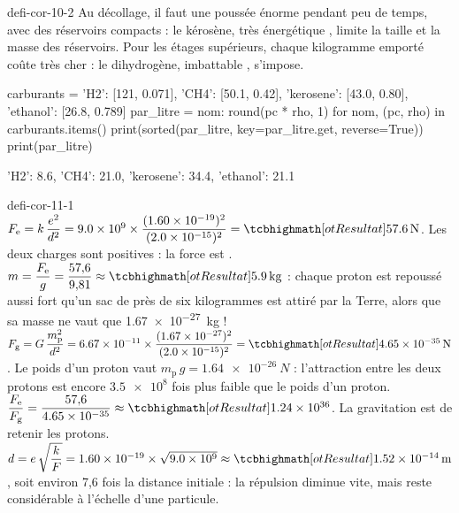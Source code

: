 \begin{blocEdition}{defi-cor-10-2}
\label{figedition-defi-cor-10-2-1}
Au décollage, il faut une poussée énorme pendant peu de temps, avec des réservoirs compacts : le kérosène, très
énergétique , limite la taille et la masse des réservoirs. Pour les étages supérieurs, chaque kilogramme
emporté coûte très cher : le dihydrogène, imbattable , s'impose.
\begin{python}
carburants = {'H2': [121, 0.071], 'CH4': [50.1, 0.42],
              'kerosene': [43.0, 0.80], 'ethanol': [26.8, 0.789]}
par_litre = {nom: round(pc * rho, 1) for nom, (pc, rho) in carburants.items()}
print(sorted(par_litre, key=par_litre.get, reverse=True))
print(par_litre)
\end{python}
\begin{console}
{'H2': 8.6, 'CH4': 21.0, 'kerosene': 34.4, 'ethanol': 21.1}
\end{console}
\end{blocEdition}

\begin{blocEdition}{defi-cor-11-1}
$F_\mathrm{e}=k\,\dfrac{e^2}{d^2}=\num{9,0e9}\times\dfrac{(\num{1,60e-19})^2}{(\num{2,0e-15})^2}=\res{\qty{57,6}{N}}$. Les deux charges sont positives : la force est .
$m=\dfrac{F_\mathrm{e}}{g}=\dfrac{57{,}6}{9{,}81}\approx\res{\qty{5,9}{kg}}$ : chaque proton est repoussé aussi fort qu'un sac de près de six kilogrammes est
attiré par la Terre, alors que sa masse ne vaut que \qty{1,67e-27}{kg} !
$F_\mathrm{g}=G\,\dfrac{m_\mathrm{p}^2}{d^2}=\num{6,67e-11}\times\dfrac{(\num{1,67e-27})^2}{(\num{2,0e-15})^2}=\res{\qty{4,65e-35}{N}}$. Le poids d'un proton vaut
$m_\mathrm{p}\,g=\qty{1,64e-26}{N}$ : l'attraction entre les deux protons est encore $\num{3,5e8}$ fois plus faible que le poids d'un proton.
$\dfrac{F_\mathrm{e}}{F_\mathrm{g}}=\dfrac{57{,}6}{\num{4,65e-35}}\approx\res{\num{1,24e36}}$. La gravitation est  de retenir les protons.
$d=e\,\sqrt{\dfrac{k}{F}}=\num{1,60e-19}\times\sqrt{\num{9,0e9}}\approx\res{\qty{1,52e-14}{m}}$, soit environ 7,6 fois la distance initiale : la répulsion
diminue vite, mais reste considérable à l'échelle d'une particule.
\label{figedition-defi-cor-11-1-1}
\end{blocEdition}

